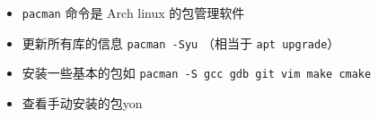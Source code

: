 
\begin{issues}
\issueDraft
\end{issues}

\begin{itemize}
\item \verb|pacman| 命令是 Arch linux 的包管理软件
\item 更新所有库的信息 \verb|pacman -Syu| （相当于 \verb|apt upgrade|）
\item 安装一些基本的包如 \verb|pacman -S gcc gdb git vim make cmake|
\item 查看手动安装的包yon
\end{itemize}

